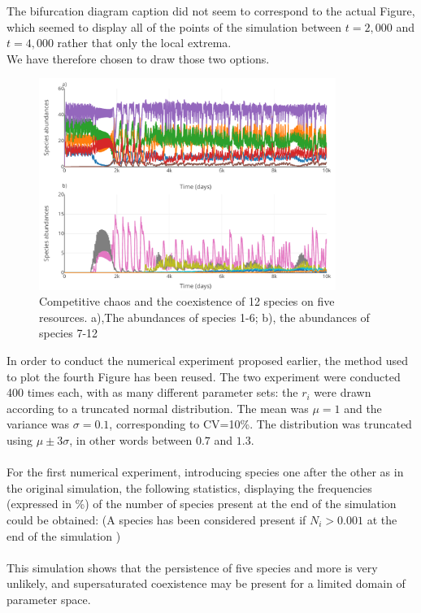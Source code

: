 The bifurcation diagram caption did not seem to correspond to the actual 
Figure, which seemed to display all of the points of the simulation between 
$t=2,000$ and $t=4,000$ rather that only the local extrema.\\
We have therefore chosen to draw those two options. 
\begin{figure}[H]
\begin{center} 
 \includegraphics[width=0.86\textwidth]{../Code/Figures/Figure_4.pdf}
  \caption{Competitive chaos and the coexistence of 12 species on five 
resources. a),The abundances of species 1-6; b), the abundances of species 7-12}
  \label{figures:Fig4}
\end{center}
  \end{figure}
In order to conduct the numerical experiment proposed earlier, the method used to plot the 
fourth Figure has been reused. The two experiment were conducted 400 times each, 
with as many different parameter sets: the $r_i$ were drawn according to a 
truncated normal distribution. The mean was $\mu=1$ and the variance was 
$\sigma=0.1$, corresponding to CV=10\%. The distribution was truncated using $\mu\pm3\sigma$, in other 
words between $0.7$ and $1.3$.\\~\\

For the first numerical experiment, introducing species one after the other as in the 
original simulation, the following statistics, displaying the frequencies 
(expressed in \%) of the number of species present at the end of the simulation 
could be obtained: (A species has been considered present if $N_i > 0.001$ at 
the end of the simulation )\\


\\
This simulation shows that the persistence of five species and more is 
very unlikely, and supersaturated coexistence may be present for a limited domain of parameter space.\\

